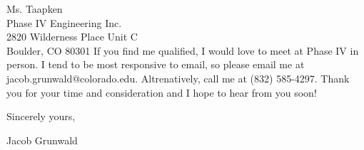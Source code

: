\documentclass[11pt]{letter} %
\begin{document}
\begin{letter}{Ms. Taapken \\
Phase IV Engineering Inc. \\
2820 Wilderness Place Unit C \\
Boulder, CO 80301}
If you find me qualified, I would love to meet at Phase IV in person. I tend to be most responsive to email, so please email me at jacob.grunwald@colorado.edu. Altrenatively, call me at (832) 585-4297. Thank you for your time and consideration and I hope to hear from you soon!

Sincerely yours,

Jacob Grunwald


\end{letter}
\end{document}
